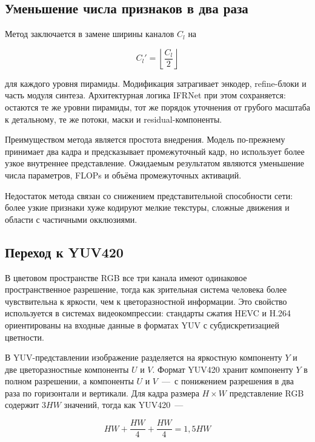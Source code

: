 \subsection*{Уменьшение числа признаков в два раза}

Метод заключается в замене ширины каналов $C_l$ на

\begin{equation}
	C_l' = \left\lfloor \frac{C_l}{2} \right\rfloor
\end{equation}

для каждого уровня пирамиды. Модификация затрагивает энкодер, refine-блоки и часть модуля синтеза. Архитектурная логика IFRNet при этом сохраняется: остаются те же уровни пирамиды, тот же порядок уточнения от грубого масштаба к детальному, те же потоки, маски и residual-компоненты.

Преимуществом метода является простота внедрения. Модель по-прежнему принимает два кадра и предсказывает промежуточный кадр, но использует более узкое внутреннее представление. Ожидаемым результатом являются уменьшение числа параметров, FLOPs и объёма промежуточных активаций.

Недостаток метода связан со снижением представительной способности сети: более узкие признаки хуже кодируют мелкие текстуры, сложные движения и области с частичными окклюзиями.

\subsection*{Переход к YUV420}

В цветовом пространстве RGB все три канала имеют одинаковое пространственное разрешение, тогда как зрительная система человека более чувствительна к яркости, чем к цветоразностной информации. Это свойство используется в системах видеокомпрессии: стандарты сжатия HEVC и H.264 ориентированы на входные данные в форматах YUV с субдискретизацией цветности.

В YUV-представлении изображение разделяется на яркостную компоненту $Y$ и две цветоразностные компоненты $U$ и $V$. Формат YUV420 хранит компоненту $Y$ в полном разрешении, а компоненты $U$ и $V$~---~с понижением разрешения в два раза по горизонтали и вертикали. Для кадра размера $H \times W$ представление RGB содержит $3HW$ значений, тогда как YUV420~---~

\begin{equation}
HW + \frac{HW}{4} + \frac{HW}{4} = 1{,}5HW
\end{equation}

